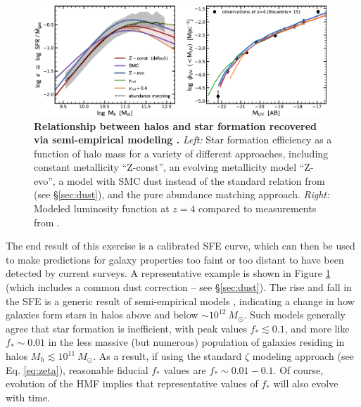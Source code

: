 \begin{figure}[]
\begin{center}
\includegraphics[width=0.98\textwidth]{Mirocha/tacchella2018_fig2.pdf}
\end{center}
\caption{{\bf Relationship between halos and star formation recovered via semi-empirical modeling \cite{Tacchella2018}.} \textit{Left:} Star formation efficiency as a function of halo mass for a variety of different approaches, including constant metallicity ``Z-const'', an evolving metallicity model ``Z-evo'', a model with SMC dust instead of the standard relation from \cite{Meurer1999} (see \S\ref{sec:dust}), and the pure abundance matching approach. \textit{Right:} Modeled luminosity function at $z=4$ compared to measurements from \cite{Bouwens2015}.}
\label{fig:sfe_lf}
\end{figure}

The end result of this exercise is a calibrated SFE curve, which can then be used to make predictions for galaxy properties too faint or too distant to have been detected by current surveys. A representative example \cite{Tacchella2018} is shown in Figure \ref{fig:sfe_lf} (which includes a common dust correction -- see \S\ref{sec:dust}). The rise and fall in the SFE is a generic result of semi-empirical models \cite{Trenti2010,Mason2015,Sun2016,Mashian2016,Tacchella2018}, indicating a change in how galaxies form stars in halos above and below $\sim 10^{12} \ M_{\odot}$. Such models generally agree that star formation is inefficient, with peak values $f_{\ast} \lesssim 0.1$, and more like $f_{\ast} \sim 0.01$ in the less massive (but numerous) population of galaxies residing in halos $M_h \lesssim 10^{11} \ M_{\odot}$. As a result, if using the standard $\zeta$ modeling approach (see Eq. \ref{eq:zeta}), reasonable fiducial $f_{\ast}$ values are $f_{\ast} \sim 0.01-0.1$. Of course, evolution of the HMF implies that representative values of $f_{\ast}$ will also evolve with time.

